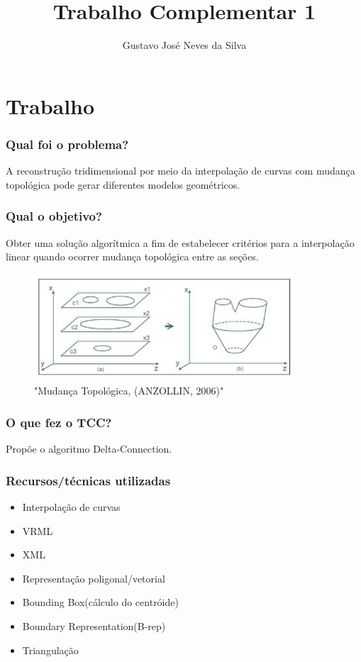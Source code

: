 \documentclass{beamer}
\title{Trabalho Complementar 1}
\author{Gustavo José Neves da Silva}
\date{}
\begin{document}
    
    \begin{frame}
      \titlepage
    \end{frame}
    
\section{Trabalho}
\begin{frame}[fragile]
    \frametitle{Qual foi o problema?}
    A reconstrução tridimensional por meio da interpolação de curvas com mudança topológica pode gerar diferentes modelos geométricos.

\end{frame}

\begin{frame}[fragile]
  \frametitle{Qual o objetivo?}
  Obter uma solução algorítmica a fim de estabelecer critérios para a interpolação linear quando ocorrer mudança topológica entre as seções.
  \begin{figure}
    \includegraphics[height=4cm]{./imagens/image3721}
    \caption{"Mudança Topológica, (ANZOLLIN, 2006)"}
  \end{figure}
\end{frame}

\begin{frame}[fragile]
  \frametitle{O que fez o TCC?}
  Propõe o algoritmo Delta-Connection.

\end{frame}


\begin{frame}[fragile]
  \frametitle{Recursos/técnicas utilizadas}
  \begin{itemize}
    \item Interpolação de curvas
    \item VRML
    \item XML
    \item Representação poligonal/vetorial
    \item Bounding Box(cálculo do centróide)
    \item Boundary Representation(B-rep)
    \item Triangulação
  \end{itemize}
\end{frame}
\end{document}
